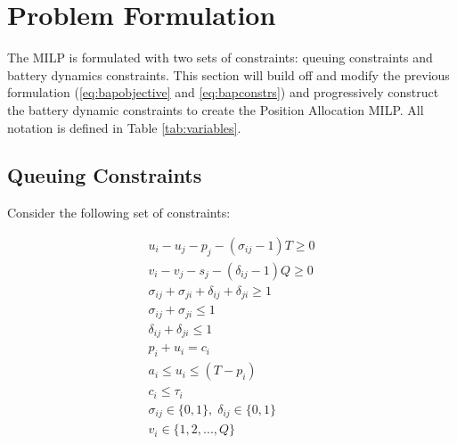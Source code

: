 \documentclass[letterpaper, 10pt, conference]{IEEEtran}
\begin{document}
\section{Problem Formulation}
\label{sec:problemformulation}
The MILP is formulated with two sets of constraints: queuing constraints and battery dynamics constraints. This section will build off and modify the previous formulation (\eqref{eq:bapobjective} and \eqref{eq:bapconstrs}) and progressively construct the battery dynamic constraints to create the Position Allocation MILP. All notation is defined in Table \ref{tab:variables}.

\subsection{Queuing Constraints}
\noindent
Consider the following set of constraints:

\begin{subequations}
\label{eq:packconstrs}
\begin{align}
    u_i - u_j - p_j - (\sigma_{ij} - 1)T \geq 0                      \label{subeq:time}         \\
    v_i - v_j - s_j - (\delta_{ij} - 1)Q \geq 0                      \label{subeq:space}        \\
    \sigma_{ij} + \sigma_{ji} + \delta_{ij} + \delta_{ji} \geq 1     \label{subeq:valid_pos}    \\
    \sigma_{ij} + \sigma_{ji} \leq 1                                 \label{subeq:sigma}        \\
    \delta_{ij} + \delta_{ji} \leq 1                                 \label{subeq:delta}        \\
    p_i + u_i = c_i                                                  \label{subeq:detach}       \\
    a_i \leq u_i \leq (T - p_i)                                      \label{subeq:valid_starts} \\
    c_i \leq \tau_i                                                  \label{subeq:valid_depart} \\
    \sigma_{ij} \in \{0,1\},\;\delta_{ij} \in \{0,1\}                \label{subeq:sdspace}      \\
    v_i \in \{1,2, ... , Q\}                                         \label{subeq:vspace}        \\
\end{align}
\end{subequations}
\end{document}
